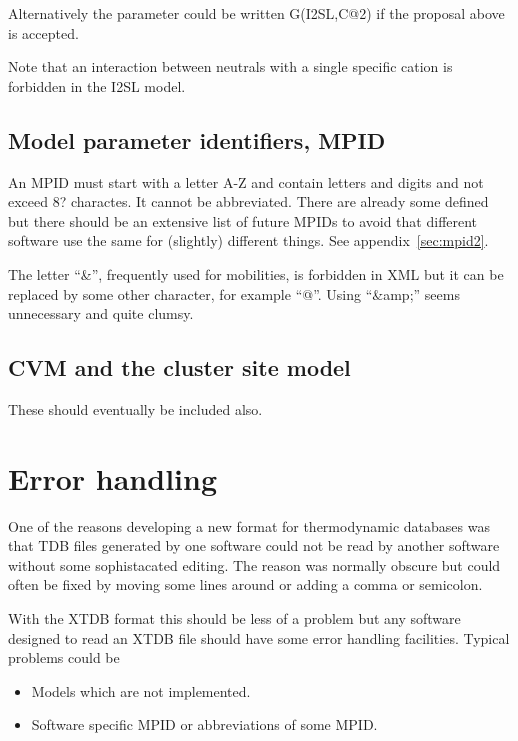 \documentclass{article}
\begin{document}
Alternatively the parameter could be written G(I2SL,C@2) if the
proposal above is accepted.

Note that an interaction between neutrals with a single specific
cation is forbidden in the I2SL model.

\newpage 

\subsection{Model parameter identifiers, MPID}\label{sec:mpid}

An MPID must start with a letter A-Z and contain letters and digits
and not exceed 8? charactes.  It cannot be abbreviated.  There are
already some defined but there should be an extensive list of future
MPIDs to avoid that different software use the same for (slightly)
different things.  See appendix~\ref{sec:mpid2}.
  
The letter ``\&'', frequently used for mobilities, is forbidden in XML
but it can be replaced by some other character, for example ``@''.
Using ``\&amp;'' seems unnecessary and quite clumsy.

\subsection{CVM and the cluster site model}

These should eventually be included also.


\section{Error handling}

One of the reasons developing a new format for thermodynamic databases
was that TDB files generated by one software could not be read by
another software without some sophistacated editing.  The reason was
normally obscure but could often be fixed by moving some lines around
or adding a comma or semicolon.

With the XTDB format this should be less of a problem but any software
designed to read an XTDB file should have some error handling
facilities.  Typical problems could be

\begin{itemize}
\item Models which are not implemented.
\item Software specific MPID or abbreviations of some MPID.
\end{itemize}
\end{document}
